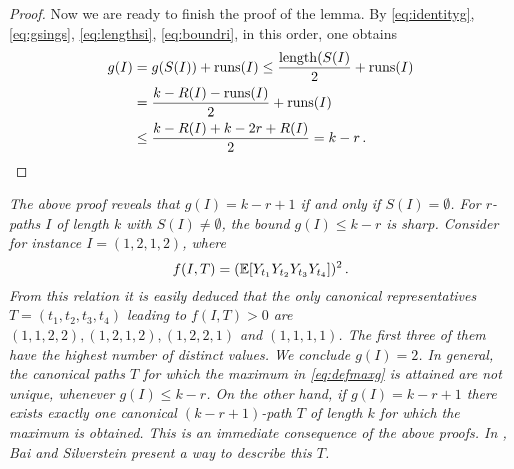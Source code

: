 \begin{proof}
\par
Now we are ready to finish the proof of the lemma.
By \eqref{eq:identityg}, \eqref{eq:gsings}, \eqref{eq:lengthsi}, \eqref{eq:boundri},  
in this order, one obtains
\begin{equation*}
\begin{split}
g(I)&= g(S(I))+ \operatorname{runs}(I) \le \frac{\operatorname{length}(S(I)}{2}+ \operatorname{runs}(I)\\
&= \frac{k-R(I)-\operatorname{runs}(I)}{2}+ \operatorname{runs}(I)\\
&\le \frac{k-R(I)+k-2r+R(I)}{2} =k-r\,.
\end{split}
\end{equation*}
\end{proof}
\begin{remark}\label{re:notunique}{\em 
The above proof reveals that $g(I)=k-r+1$ if and only if $S(I)= \emptyset$. For $r$-paths $I$ of length $k$ with $S(I)\neq \emptyset$, the bound $g(I)\le k-r$ is sharp. Consider for instance $I=(1,2,1,2)$, where 
\begin{equation*}
f(I,T)=(\mathbb{E}[ Y_{t_1}Y_{t_2}Y_{t_3}Y_{t_4} ])^2\,.
\end{equation*}
From this relation it is easily deduced that the only canonical representatives $T=(t_1,t_2,t_3,t_4)$ leading to $f(I,T)>0$ are $(1,1,2,2),(1,2,1,2),(1,2,2,1)$ and $(1,1,1,1)$. The first three of them have the highest number of distinct values. We conclude $g(I)=2$. In general, the canonical paths $T$ for which the maximum in \eqref{eq:defmaxg} is attained are not unique, whenever $g(I)\le k-r$. On the other hand, if $g(I)= k-r+1$ there exists exactly one canonical $(k-r+1)$-path $T$ of length $k$ for which the maximum is obtained. This is an immediate consequence of the above proofs. In \cite{bai:silverstein:2010}, Bai and Silverstein present a way to describe this $T$. 
}\end{remark}

